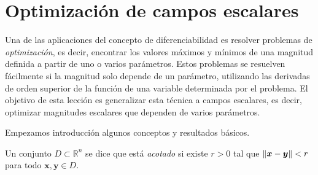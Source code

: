 \section{Optimización de campos escalares}

Una de las aplicaciones del concepto de diferenciabilidad es resolver problemas de \emph{optimización}, es decir, encontrar los valores máximos y mínimos de una magnitud definida a partir de uno o varios parámetros.
Estos problemas se resuelven fácilmente si la magnitud solo depende de un parámetro, utilizando las derivadas de orden superior de la función de una variable determinada por el problema.
El objetivo de esta lección es generalizar esta técnica a campos escalares, es decir, optimizar magnitudes escalares que dependen de varios parámetros.

Empezamos introducción algunos conceptos y resultados básicos.
%
%

\begin{definicion}
Un conjunto $\mathit{D}\subset \mathbb{R}^n$ se dice que está \emph{acotado} si existe $r>0$
tal que $\|\boldsymbol{x}-\boldsymbol{y}\|< r$ para todo $\boldsymbol x,\boldsymbol y\in D$.
\end{definicion}

